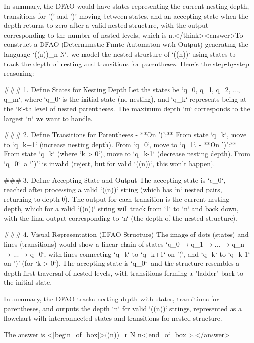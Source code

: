 In summary, the DFAO would have states representing the current nesting depth, transitions for '(' and ')' moving between states, and an accepting state when the depth returns to zero after a valid nested structure, with the output corresponding to the number of nested levels, which is n.</think><answer>To construct a DFAO (Deterministic Finite Automaton with Output) generating the language `((n))_n N`, we model the nested structure of `((n))` using states to track the depth of nesting and transitions for parentheses. Here's the step-by-step reasoning:  


### 1. Define States for Nesting Depth  
Let the states be `q_0, q_1, q_2, ..., q_m`, where `q_0` is the initial state (no nesting), and `q_k` represents being at the `k`-th level of nested parentheses. The maximum depth `m` corresponds to the largest `n` we want to handle.  


### 2. Define Transitions for Parentheses  
- **On '(':** From state `q_k`, move to `q_{k+1}` (increase nesting depth). From `q_0`, move to `q_1`.  
- **On ')':** From state `q_k` (where `k > 0`), move to `q_{k-1}` (decrease nesting depth). From `q_0`, a `')'` is invalid (reject, but for valid `((n))`, this won’t happen).  


### 3. Define Accepting State and Output  
The accepting state is `q_0`, reached after processing a valid `((n))` string (which has `n` nested pairs, returning to depth 0). The output for each transition is the current nesting depth, which for a valid `((n))` string will track from `1` to `n` and back down, with the final output corresponding to `n` (the depth of the nested structure).  


### 4. Visual Representation (DFAO Structure)  
The image of dots (states) and lines (transitions) would show a linear chain of states `q_0 → q_1 → ... → q_n → ... → q_0`, with lines connecting `q_k` to `q_{k+1}` on '(', and `q_k` to `q_{k-1}` on ')' (for `k > 0`). The accepting state is `q_0`, and the structure resembles a depth-first traversal of nested levels, with transitions forming a "ladder" back to the initial state.  


In summary, the DFAO tracks nesting depth with states, transitions for parentheses, and outputs the depth `n` for valid `((n))` strings, represented as a flowchart with interconnected states and transitions for nested structure.  

The answer is <|begin_of_box|>((n))_n N  n<|end_of_box|>.</answer>